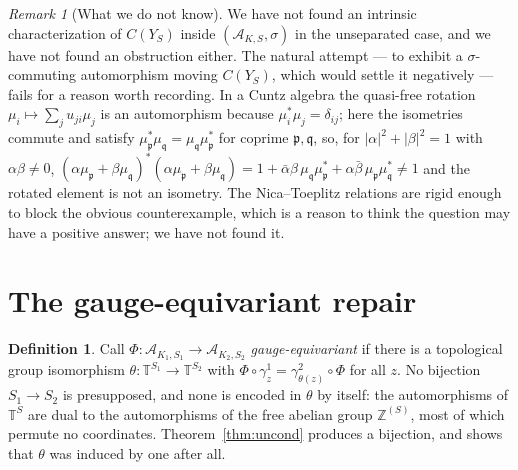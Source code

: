 \documentclass[11pt]{amsart}
\numberwithin{equation}{section}
\theoremstyle{definition}
\newtheorem{definition}[theorem]{Definition}
\theoremstyle{remark}
\newtheorem{remark}[theorem]{Remark}
\newcommand{\Z}{\mathbb{Z}}
\newcommand{\T}{\mathbb{T}}
\newcommand{\cA}{\mathcal{A}}
\newcommand{\pp}{\mathfrak{p}}
\newcommand{\qq}{\mathfrak{q}}
\begin{document}
\begin{remark}[What we do not know]\label{rem:open}
We have not found an intrinsic characterization of $C(Y_S)$ inside $(\cA_{K,S},\sigma)$ in the
unseparated case, and we have not found an obstruction either. The natural attempt --- to
exhibit a $\sigma$-commuting automorphism moving $C(Y_S)$, which would settle it negatively
--- fails for a reason worth recording. In a Cuntz algebra the quasi-free rotation
$\mu_i\mapsto\sum_ju_{ji}\mu_j$ is an automorphism because $\mu_i^*\mu_j=\delta_{ij}$; here
the isometries commute and satisfy $\mu_\pp^*\mu_\qq=\mu_\qq\mu_\pp^*$ for coprime
$\pp,\qq$, so, for $|\alpha|^2+|\beta|^2=1$ with $\alpha\beta\ne0$,
$(\alpha\mu_\pp+\beta\mu_\qq)^*(\alpha\mu_\pp+\beta\mu_\qq)=1+\bar\alpha\beta\,\mu_\qq\mu_\pp^*+\alpha\bar\beta\,\mu_\pp\mu_\qq^*\ne1$
and the rotated element is not an isometry. The Nica--Toeplitz relations are rigid enough to
block the obvious counterexample, which is a reason to think the question may have a positive
answer; we have not found it.
\end{remark}

\section{The gauge-equivariant repair}

\begin{definition}\label{def:gaugeequiv}
Call $\Phi:\cA_{K_1,S_1}\to\cA_{K_2,S_2}$ \emph{gauge-equivariant} if there is a topological
group isomorphism $\theta:\T^{S_1}\to\T^{S_2}$ with
$\Phi\circ\gamma^1_z=\gamma^2_{\theta(z)}\circ\Phi$ for all $z$. No bijection $S_1\to S_2$ is
presupposed, and none is encoded in $\theta$ by itself: the automorphisms of $\T^{S}$ are
dual to the automorphisms of the free abelian group $\Z^{(S)}$, most of which permute no
coordinates. Theorem~\ref{thm:uncond} produces a bijection, and shows that $\theta$ was
induced by one after all.
\end{definition}
\end{document}
